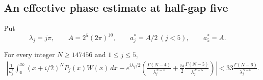 \subsection{An effective phase estimate at half-gap five}

Put
\[
 \lambda_j=j\pi,\qquad A=2^5(2\pi)^{10},\qquad
 a_j^*=A/2\ (j<5),\qquad a_5^*=A.
\]

\begin{lemma}
\label{gt:phase}
For every integer $N\ge147456$ and $1\le j\le5$,
\begin{align}
 \left|\frac1{a_j^*}\int_0^\infty(x+i/2)^NP_j(x)W(x)\,dx
 -e^{i\lambda_j/2}\left(
 \frac{\Gamma(N-4)}{\lambda_j^{N-4}}
 +\frac{5i}{2}\frac{\Gamma(N-5)}{\lambda_j^{N-5}}
                         \right)\right|
 <33\frac{\Gamma(N-6)}{\lambda_j^{N-6}}.\label{gt:phase-bound}
\end{align}
\end{lemma}

